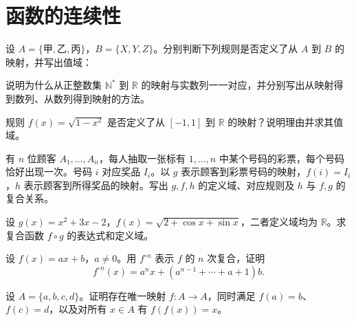\renewcommand{\thesection}{\arabic{section}}\renewcommand{\theHsection}{chapter.\arabic{section}}\setcounter{section}{1}\section{函数的连续性}
\noindent\begin{minipage}{\textwidth}
设 $A=\{\text{甲},\text{乙},\text{丙}\}$，$B=\{X,Y,Z\}$。分别判断下列规则是否定义了从 $A$ 到 $B$ 的映射，并写出值域：
\end{minipage}\par\vfill
\noindent\begin{minipage}{\textwidth}
说明为什么从正整数集 $\mathbb N^*$ 到 $\mathbb R$ 的映射与实数列一一对应，并分别写出从映射得到数列、从数列得到映射的方法。
\end{minipage}\par\vfill
\noindent\begin{minipage}{\textwidth}
规则 $f(x)=\sqrt{1-x^2}$ 是否定义了从 $[-1,1]$ 到 $\mathbb R$ 的映射？说明理由并求其值域。
\end{minipage}\par\vfill
\newpage
\noindent\begin{minipage}{\textwidth}
有 $n$ 位顾客 $A_1,\ldots,A_n$，每人抽取一张标有 $1,\ldots,n$ 中某个号码的彩票，每个号码恰好出现一次。号码 $i$ 对应奖品 $I_i$。以 $g$ 表示顾客到彩票号码的映射，$f(i)=I_i$，$h$ 表示顾客到所得奖品的映射。写出 $g,f,h$ 的定义域、对应规则及 $h$ 与 $f,g$ 的复合关系。
\end{minipage}\par\vfill
\noindent\begin{minipage}{\textwidth}
设 $g(x)=x^2+3x-2$，$f(x)=\sqrt{2+\cos x+\sin x}$，二者定义域均为 $\mathbb R$。求复合函数 $f\circ g$ 的表达式和定义域。
\end{minipage}\par\vfill
\noindent\begin{minipage}{\textwidth}
设 $f(x)=ax+b$，$a\ne0$。用 $f^{\circ n}$ 表示 $f$ 的 $n$ 次复合，证明\[f^{\circ n}(x)=a^nx+(a^{n-1}+\cdots+a+1)b.\]
\end{minipage}\par\vfill
\newpage
\noindent\begin{minipage}{\textwidth}
设 $A=\{a,b,c,d\}$。证明存在唯一映射 $f:A\to A$，同时满足 $f(a)=b$、$f(c)=d$，以及对所有 $x\in A$ 有 $f(f(x))=x$。
\end{minipage}\par\vfill
